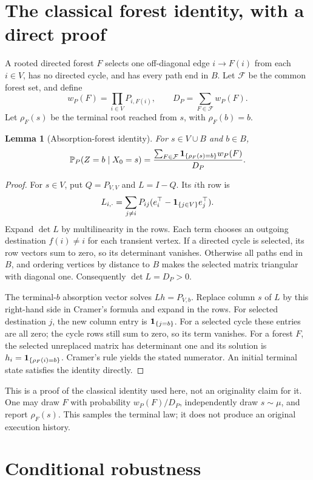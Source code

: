 \documentclass[11pt]{article}
\newtheorem{lemma}{Lemma}
\newcommand{\Prb}{\mathbb P}
\begin{document}
\section{The classical forest identity, with a direct proof}

A rooted directed forest $F$ selects one off-diagonal edge $i\to F(i)$
from each $i\in V$, has no directed cycle, and has every path end in $B$.
Let $\mathcal F$ be the common forest set, and define
\[
 w_P(F)=\prod_{i\in V}P_{i,F(i)},\qquad
 D_P=\sum_{F\in\mathcal F}w_P(F).
\]
Let $\rho_F(s)$ be the terminal root reached from $s$, with $\rho_F(b)=b$.

\begin{lemma}[Absorption-forest identity]\label{lem:forest}
For $s\in V\cup B$ and $b\in B$,
\[
 \Prb_P(Z=b\mid X_0=s)=
 \frac{\sum_{F\in\mathcal F}{\bf1}_{\{\rho_F(s)=b\}}w_P(F)}{D_P}.
\]
\end{lemma}
\begin{proof}
For $s\in V$, put $Q=P_{V,V}$ and $L=I-Q$. Its $i$th row is
\[
 L_{i,\cdot}=\sum_{j\ne i}P_{ij}
       (e_i^\top-{\bf1}_{\{j\in V\}}e_j^\top).
\]
Expand $\det L$ by multilinearity in the rows. Each term chooses an
outgoing destination $f(i)\ne i$ for each transient vertex. If a directed
cycle is selected, its row vectors sum to zero, so its determinant vanishes.
Otherwise all paths end in $B$, and ordering vertices by distance to $B$
makes the selected matrix triangular with diagonal one. Consequently
$\det L=D_P>0$.

The terminal-$b$ absorption vector solves $Lh=P_{V,b}$. Replace column $s$
of $L$ by this right-hand side in Cramer's formula and expand in the rows.
For selected destination $j$, the new column entry is $ {\bf1}_{\{j=b\}}$.
For a selected cycle these entries are all zero; the cycle rows still
sum to zero, so its term vanishes. For a forest $F$, the selected
unreplaced matrix has determinant one and its solution is
$h_i={\bf1}_{\{\rho_F(i)=b\}}$. Cramer's rule yields the stated numerator.
An initial terminal state satisfies the identity directly.
\end{proof}

This is a proof of the classical identity used here, not an originality
claim for it. One may draw $F$ with probability $w_P(F)/D_P$, independently
draw $s\sim\mu$, and report $\rho_F(s)$. This samples the terminal law;
it does not produce an original execution history.

\section{Conditional robustness}
\end{document}
